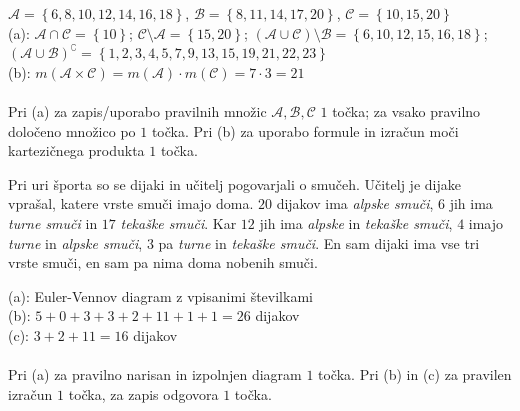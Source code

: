 \documentclass[addpoints]{exam}
\begin{document}
\begin{questions}
    \begin{solution}[9cm]
        $\mathcal{A}=\left\{6,8,10,12,14,16,18\right\}$, $\mathcal{B}=\left\{8,11,14,17,20\right\}$, $\mathcal{C}=\left\{10,15,20\right\}$ \\
        (a): $\mathcal{A}\cap\mathcal{C}=\left\{10\right\}$; $\mathcal{C}\setminus\mathcal{A}=\left\{15,20\right\}$; $(\mathcal{A}\cup\mathcal{C})\setminus\mathcal{B}=\left\{6,10,12,15,16,18\right\}$; $(\mathcal{A}\cup\mathcal{B})^\complement=\left\{1,2,3,4,5,7,9,13,15,19,21,22,23\right\}$ \\
        (b): $m(\mathcal{A}\times\mathcal{C})=m(\mathcal{A})\cdot m(\mathcal{C})=7\cdot 3 = 21$ \\ \\
        Pri (a) za zapis/uporabo pravilnih množic $\mathcal{A}, \mathcal{B}, \mathcal{C}$ $1$ točka; za vsako pravilno določeno množico po $1$ točka. Pri (b) za uporabo formule in izračun moči kartezičnega produkta $1$ točka.
    \end{solution}


    \newpage
    \question
    Pri uri športa so se dijaki in učitelj pogovarjali o smučeh.  Učitelj je dijake vprašal, katere vrste smuči imajo doma.
    $20$ dijakov ima \textit{alpske smuči}, $6$ jih ima \textit{turne smuči} in $17$ \textit{tekaške smuči}. Kar $12$ jih ima \textit{alpske} in \textit{tekaške smuči}, $4$ imajo \textit{turne} in \textit{alpske smuči},
    $3$ pa \textit{turne} in \textit{tekaške smuči}. En sam dijaki ima vse tri vrste smuči, en sam pa nima doma nobenih smuči. 

    \begin{solution}[8cm]
        (a): Euler-Vennov diagram z vpisanimi številkami \\
        (b): $5+0+3+3+2+11+1+1=26$ dijakov \\
        (c): $3+2+11=16$ dijakov \\ \\
        Pri (a) za pravilno narisan in izpolnjen diagram $1$ točka. Pri (b) in (c) za pravilen izračun $1$ točka, za zapis odgovora $1$ točka.
    \end{solution}





\end{questions}
\end{document}
